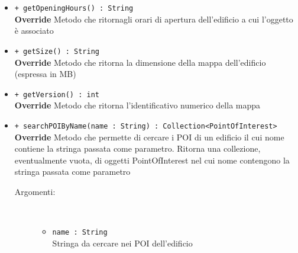 \documentclass[../DefinizioneDiProdotto.tex]{subfiles}
\begin{document}
\begin{description}
\begin{itemize}
		\item \texttt{+ getOpeningHours() : String}\\
		\textbf{Override} Metodo che ritornagli orari di apertura dell'edificio a cui l'oggetto è associato
		\item \texttt{+ getSize() : String}\\
		\textbf{Override} Metodo che ritorna la dimensione della mappa dell'edificio (espressa in MB)
		\item \texttt{+ getVersion() : int}\\
		\textbf{Override} Metodo che ritorna l'identificativo numerico della mappa
		\item \texttt{+ searchPOIByName(name : String) : Collection<PointOfInterest>}\\
		\textbf{Override} Metodo che permette di cercare i POI di un edificio il cui nome contiene la stringa passata come parametro. Ritorna una collezione, eventualmente vuota,  di oggetti PointOfInterest nel cui nome contengono la stringa passata come parametro
		\begin{description}
			\item[Argomenti:] \
			\begin{itemize}
				\item \texttt{name : String}\\
				Stringa da cercare nei POI dell'edificio\end{itemize}
		\end{description}
	\end{itemize}
\end{description}
\end{document}
